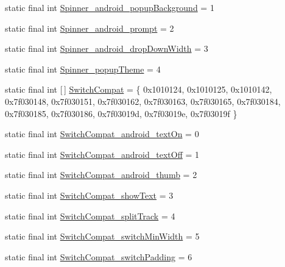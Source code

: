 \begin{DoxyCompactItemize}
static final int \mbox{\hyperlink{classcom_1_1synnapps_1_1carouselview_1_1_r_1_1styleable_aca6ff944a16bf542f829d3ef8e061651}{Spinner\+\_\+android\+\_\+popup\+Background}} = 1
\item 
static final int \mbox{\hyperlink{classcom_1_1synnapps_1_1carouselview_1_1_r_1_1styleable_a9ec659e97a78fc65adfdaed248ee8f46}{Spinner\+\_\+android\+\_\+prompt}} = 2
\item 
static final int \mbox{\hyperlink{classcom_1_1synnapps_1_1carouselview_1_1_r_1_1styleable_a592ee8887661f1df42604e9d6fa903db}{Spinner\+\_\+android\+\_\+drop\+Down\+Width}} = 3
\item 
static final int \mbox{\hyperlink{classcom_1_1synnapps_1_1carouselview_1_1_r_1_1styleable_ac6293ef9fac1983dfe633d36a0a7223b}{Spinner\+\_\+popup\+Theme}} = 4
\item 
static final int \mbox{[}$\,$\mbox{]} \mbox{\hyperlink{classcom_1_1synnapps_1_1carouselview_1_1_r_1_1styleable_a81ef64d81365bb2fe8d0eddf0bc8c5e9}{Switch\+Compat}} = \{ 0x1010124, 0x1010125, 0x1010142, 0x7f030148, 0x7f030151, 0x7f030162, 0x7f030163, 0x7f030165, 0x7f030184, 0x7f030185, 0x7f030186, 0x7f03019d, 0x7f03019e, 0x7f03019f \}
\item 
static final int \mbox{\hyperlink{classcom_1_1synnapps_1_1carouselview_1_1_r_1_1styleable_a73b1a1a4fe45b8b8771b66c070cbb625}{Switch\+Compat\+\_\+android\+\_\+text\+On}} = 0
\item 
static final int \mbox{\hyperlink{classcom_1_1synnapps_1_1carouselview_1_1_r_1_1styleable_a25a6ef6535b3757b55eac3cad715cc89}{Switch\+Compat\+\_\+android\+\_\+text\+Off}} = 1
\item 
static final int \mbox{\hyperlink{classcom_1_1synnapps_1_1carouselview_1_1_r_1_1styleable_a2d35d4f3549412567a99a3813fd19f26}{Switch\+Compat\+\_\+android\+\_\+thumb}} = 2
\item 
static final int \mbox{\hyperlink{classcom_1_1synnapps_1_1carouselview_1_1_r_1_1styleable_ae9bc14b6d6e6fc662909e9634f9aadf3}{Switch\+Compat\+\_\+show\+Text}} = 3
\item 
static final int \mbox{\hyperlink{classcom_1_1synnapps_1_1carouselview_1_1_r_1_1styleable_a878b0189a96f34009f4712d1c1700848}{Switch\+Compat\+\_\+split\+Track}} = 4
\item 
static final int \mbox{\hyperlink{classcom_1_1synnapps_1_1carouselview_1_1_r_1_1styleable_a770fdc228077e278db8f325759c36920}{Switch\+Compat\+\_\+switch\+Min\+Width}} = 5
\item 
static final int \mbox{\hyperlink{classcom_1_1synnapps_1_1carouselview_1_1_r_1_1styleable_a07cd0cca825c108cdc1657dd14d6f991}{Switch\+Compat\+\_\+switch\+Padding}} = 6

\end{DoxyCompactItemize}
